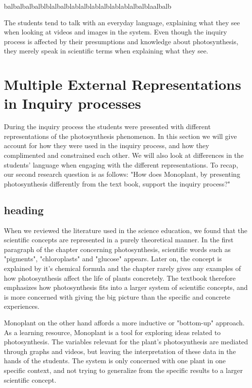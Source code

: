 balbalbalbalblblalbalblablalblablalblablablalbalblaalbalb

The students tend to talk with an everyday language, explaining what they see when looking at videos and images in the system. Even though the inquiry process is affected by their presumptions and knowledge about photosynthesis, they merely speak in scientific terms when explaining what they see. 



\section{Multiple External Representations in Inquiry processes}
During the inquiry process the students were presented with different representations of the photosynthesis phenomenon. In this section we will give account for how they were used in the inquiry process, and how they complimented and constrained each other. We will also look at differences in the students' language when engaging with the different representations. To recap, our second research question is as follows: "How does Monoplant, by presenting photosynthesis differently from the text book, support the inquiry process?"

\subsection{heading}
When we reviewed the literature used in the science education, we found that the scientific concepts are represented in a purely theoretical manner. In the first paragraph of the chapter concerning photosynthesis, scientific words such as "pigments", "chloroplasts" and "glucose" appears. Later on, the concept is explained by it's chemical formula and the chapter rarely gives any examples of how photosynthesis affect the life of plants concretely. The textbook therefore emphasizes how photosynthesis fits into a larger system of scientific concepts, and is more concerned with giving the big picture than the specific and concrete experiences. 

Monoplant on the other hand affords a more inductive or "bottom-up" approach. As a learning resource, Monoplant is a tool for exploring ideas related to photosynthesis. The variables relevant for the plant's photosynthesis are mediated through graphs and videos, but leaving the interpretation of these data in the hands of the students. The system is only concerned with one plant in one specific context, and not trying to generalize from the specific results to a larger scientific concept. 

